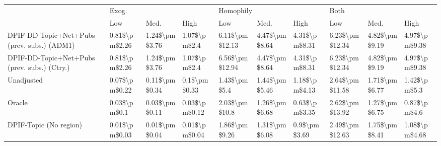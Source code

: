 \begin{tabular}{llllllllll}
\toprule
{} & \multicolumn{3}{l}{Exog.} & \multicolumn{3}{l}{Homophily} & \multicolumn{3}{l}{Both} \\
{} &            Low &           Med. &           High &             Low &           Med. &           High &             Low &           Med. &           High \\
\midrule
DPIF-DD-Topic+Net+Pubs (prev. subs.) (ADM1)  &  0.81\$\textbackslash pm\$2.26 &  1.24\$\textbackslash pm\$3.76 &   1.07\$\textbackslash pm\$2.4 &  6.11\$\textbackslash pm\$12.13 &  4.47\$\textbackslash pm\$8.64 &  4.31\$\textbackslash pm\$8.31 &  6.23\$\textbackslash pm\$12.34 &  4.82\$\textbackslash pm\$9.19 &  4.97\$\textbackslash pm\$9.38 \\
DPIF-DD-Topic+Net+Pubs (prev. subs.) (Ctry.) &  0.81\$\textbackslash pm\$2.26 &  1.24\$\textbackslash pm\$3.76 &   1.07\$\textbackslash pm\$2.4 &  6.56\$\textbackslash pm\$12.94 &  4.47\$\textbackslash pm\$8.64 &  4.31\$\textbackslash pm\$8.31 &  6.23\$\textbackslash pm\$12.34 &  4.82\$\textbackslash pm\$9.19 &  4.97\$\textbackslash pm\$9.38 \\
Unadjusted                                   &  0.07\$\textbackslash pm\$0.22 &  0.11\$\textbackslash pm\$0.34 &   0.1\$\textbackslash pm\$0.33 &    1.43\$\textbackslash pm\$5.4 &  1.44\$\textbackslash pm\$5.46 &  1.18\$\textbackslash pm\$4.13 &  2.64\$\textbackslash pm\$11.58 &  1.71\$\textbackslash pm\$6.77 &   1.42\$\textbackslash pm\$5.3 \\
Oracle                                       &   0.03\$\textbackslash pm\$0.1 &  0.03\$\textbackslash pm\$0.11 &  0.03\$\textbackslash pm\$0.12 &   2.03\$\textbackslash pm\$10.8 &  1.26\$\textbackslash pm\$6.68 &  0.63\$\textbackslash pm\$3.35 &  2.62\$\textbackslash pm\$13.92 &  1.27\$\textbackslash pm\$6.75 &   0.87\$\textbackslash pm\$4.6 \\
DPIF-Topic (No region)                       &  0.01\$\textbackslash pm\$0.03 &  0.01\$\textbackslash pm\$0.04 &  0.01\$\textbackslash pm\$0.04 &   1.86\$\textbackslash pm\$9.26 &  1.31\$\textbackslash pm\$6.08 &   0.9\$\textbackslash pm\$3.69 &  2.49\$\textbackslash pm\$12.63 &  1.75\$\textbackslash pm\$8.41 &  1.08\$\textbackslash pm\$4.68 \\
\bottomrule
\end{tabular}
